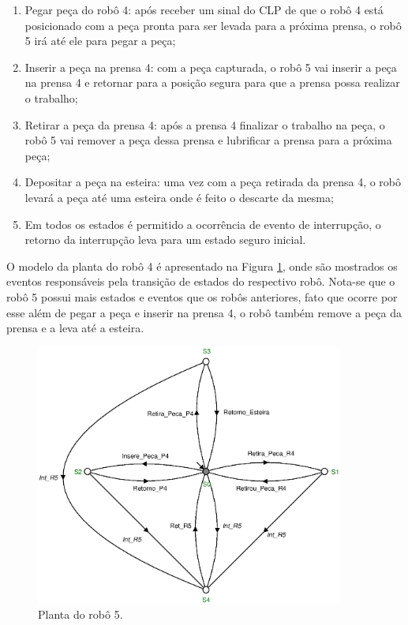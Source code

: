 \begin{enumerate}
	\item Pegar peça do robô 4: após receber um sinal do CLP de que o robô 4 está posicionado com a peça pronta para ser levada para a próxima prensa, o robô 5 irá até ele para pegar a peça;
	
	\item Inserir a peça na prensa 4: com a peça capturada, o robô 5 vai inserir a peça na prensa 4 e retornar para a posição segura para que a prensa possa realizar o trabalho;
	
	\item Retirar a peça da prensa 4: após a prensa 4 finalizar o trabalho na peça, o robô 5 vai remover a peça dessa prensa e lubrificar a prensa para a próxima peça;
	
	\item Depositar a peça na esteira: uma vez com a peça retirada da prensa 4, o robô levará a peça até uma esteira onde é feito o descarte da mesma;
	
	\item Em todos os estados é permitido a ocorrência de evento de interrupção, o retorno da interrupção leva para um estado seguro inicial.
\end{enumerate}

O modelo da planta do robô 4 é apresentado na Figura \ref{fig:robo5}, onde são mostrados os eventos responsáveis pela transição de estados do respectivo robô. Nota-se que o robô 5 possui mais estados e eventos que os robôs anteriores, fato que ocorre por esse além de pegar a peça e inserir na prensa 4, o robô também remove a peça da prensa e a leva até a esteira.

\begin{figure}[H]%
	\centering
	\includegraphics[width=0.9\textwidth]{imagens/robo_5.eps}
	\caption{Planta do robô 5.}\label{fig:robo5}
\end{figure}

